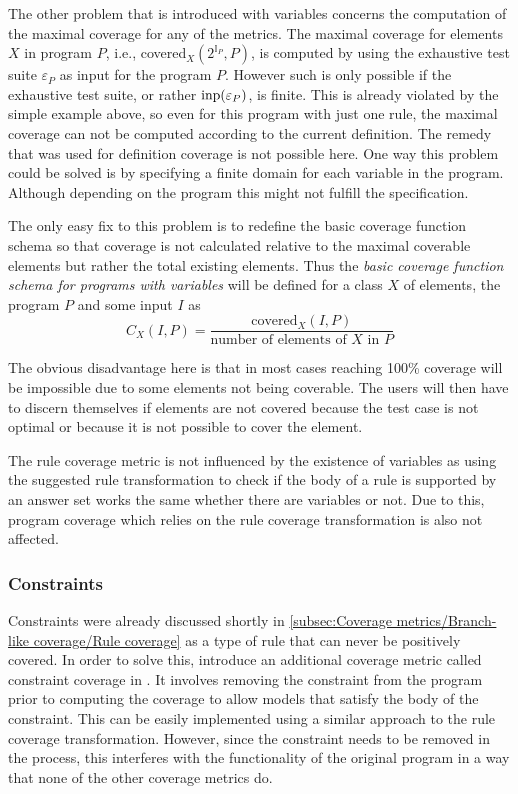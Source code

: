 The other problem that is introduced with variables concerns the computation of the maximal coverage for any of the metrics. The maximal coverage for elements $X$ in program $P$, i.e., covered$_X(2^{\mathbb{I}_P}, P)$, is computed by using the exhaustive test suite \(\varepsilon_P\) as input for the program $P$. However such is only possible if the exhaustive test suite, or rather \(\operatorname{inp}(\varepsilon_P)\), is finite. This is already violated by the simple example above, so even for this program with just one rule, the maximal coverage can not be computed according to the current definition. The remedy that was used for definition coverage is not possible here. One way this problem could be solved is by specifying a finite domain for each variable in the program. Although depending on the program this might not fulfill the specification.

The only easy fix to this problem is to redefine the basic coverage function schema so that coverage is not calculated relative to the maximal coverable elements but rather the total existing elements. Thus the \emph{basic coverage function schema for programs with variables} will be defined for a class $X$ of elements, the program $P$ and some input $I$ as
\begin{equation}
\label{eq:coverage function schema for variables}
    C_X(I, P) = \frac{\text{covered}_X(I, P)}{\text{number of elements of $X$ in $P$}}
\end{equation}

The obvious disadvantage here is that in most cases reaching 100\% coverage will be impossible due to some elements not being coverable. The users will then have to discern themselves if elements are not covered because the test case is not optimal or because it is not possible to cover the element.

The rule coverage metric is not influenced by the existence of variables as using the suggested rule transformation to check if the body of a rule is supported by an answer set works the same whether there are variables or not. Due to this, program coverage which relies on the rule coverage transformation is also not affected.

\subsubsection{Constraints}
\label{subsubsec:Coverage for further program classes/Language constructs/Constraints}
Constraints were already discussed shortly in \cref{subsec:Coverage metrics/Branch-like coverage/Rule coverage} as a type of rule that can never be positively covered. In order to solve this, \citeauthor{Jan+11} introduce an additional coverage metric called constraint coverage in \cite{Jan+11}. It involves removing the constraint from the program prior to computing the coverage to allow models that satisfy the body of the constraint. This can be easily implemented using a similar approach to the rule coverage transformation. However, since the constraint needs to be removed in the process, this interferes with the functionality of the original program in a way that none of the other coverage metrics do.

